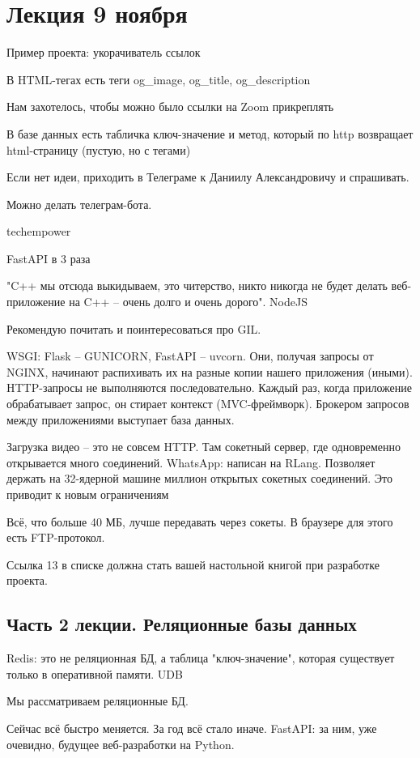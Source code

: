\documentclass[main.tex]{subfiles}
\begin{document}
\section{Лекция 9 ноября}

Пример проекта: укорачиватель ссылок

В HTML-тегах есть теги og\_image, og\_title, og\_description

Нам захотелось, чтобы можно было ссылки на Zoom прикреплять

В базе данных есть табличка ключ-значение и метод, который по http возвращает html-страницу (пустую, но с тегами)

Если нет идеи, приходить в Телеграме к Даниилу Александровичу и спрашивать.

Можно делать телеграм-бота.

techempower

FastAPI в 3 раза

"C++ мы отсюда выкидываем, это читерство, никто никогда не будет делать веб-приложение на C++ -- очень долго и очень дорого".
NodeJS

Рекомендую почитать и поинтересоваться про GIL.

WSGI: Flask -- GUNICORN, FastAPI -- uvcorn.
Они, получая запросы от NGINX, начинают распихивать их на разные копии нашего приложения (иными).
HTTP-запросы не выполняются последовательно.
Каждый раз, когда приложение обрабатывает запрос, он стирает контекст (MVC-фреймворк).
Брокером запросов между приложениями выступает база данных.

Загрузка видео -- это не совсем HTTP.
Там сокетный сервер, где одновременно открывается много соединений.
WhatsApp:  написан на RLang.
Позволяет держать на 32-ядерной машине миллион открытых сокетных соединений.
Это приводит к новым ограничениям

Всё, что больше 40 МБ, лучше передавать через сокеты.
В браузере для этого есть FTP-протокол.

\begin{leftbar}
Ссылка 13 в списке должна стать вашей настольной книгой при разработке проекта.
\end{leftbar}

\subsection{Часть 2 лекции. Реляционные базы данных}

Redis: это не реляционная БД, а таблица "ключ-значение", которая существует только в оперативной памяти.
UDB

Мы рассматриваем реляционные БД.

Сейчас всё быстро меняется.
За год всё стало иначе.
FastAPI: за ним, уже очевидно, будущее веб-разработки на Python.
\end{document}
